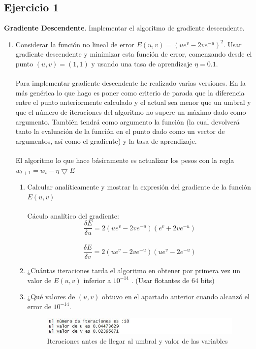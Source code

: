 		\subsection{Ejercicio 1}
		 \textbf{Gradiente Descendente}. Implementar el algoritmo de gradiente descendente.
		\begin{enumerate}
			\item \label{1} Considerar la función no lineal de error $E(u,v)=(ue^v-2ve^{-u})^2$. Usar gradiente descendente y minimizar esta función de error, comenzando desde el punto $(u,v)=(1,1)$ y usando una tasa de aprendizaje $\eta=0.1$.
			\\
			\\
			
			Para implementar gradiente descendente he realizado varias versiones. En la más genérica lo que hago es poner como criterio de parada que la diferencia entre el punto anteriormente calculado y el actual sea menor que un umbral y que el número de iteraciones del algoritmo no supere un máximo dado como argumento. También tendrá como argumento la función (la cual devolverá tanto la evaluación de la función en el punto dado como un vector de argumentos, así como el gradiente) y la tasa de aprendizaje.
			\\
			\\
			
			El algoritmo lo que hace básicamente es actualizar los pesos con la regla $w_{t+1}=w_{t}-\eta \bigtriangledown E $
			\begin{enumerate}
				\item Calcular analíticamente y mostrar la expresión del gradiente de la función $E(u,v)$
				\\
				\\
				Cáculo analítico del gradiente:
				\\
				
				$$\frac{\delta E}{\delta u} = 2(ue^{v}-2ve^{-u})(e^{v}+2ve^{-u})$$
				\\
				$$\frac{\delta E}{\delta v} = 2(ue^{v}-2ve^{-u})(ue^{v}-2e^{-u})$$
				\item ¿Cuántas iteraciones tarda el algoritmo en obtener por primera vez un valor de $E(u,v)$ inferior  a $10^{-14}$ . (Usar flotantes de 64 bits)
				
				\item ¿Qué valores de $(u,v)$ obtuvo en el apartado anterior cuando alcanzó el error de $10^{-14}$.
				\begin{figure} [H]
				\centering
				\includegraphics[width=0.7\linewidth]{captura1}
				\caption{Iteraciones antes de llegar al umbral y valor de las variables}
				\label{fig:captura1}
				\end{figure}
				

\end{enumerate}
\end{enumerate}
